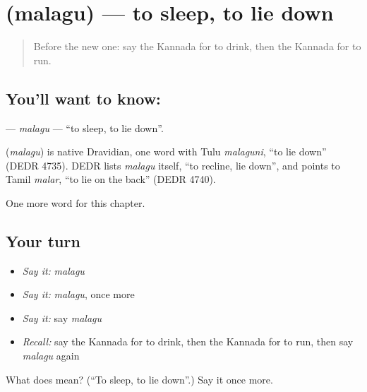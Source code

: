 \section[\texorpdfstring{\kn{ಮಲಗು} (malagu)}{ಮಲಗು (malagu)}]{ (malagu) — to sleep, to lie down}

\label{lesson:KA-C147-malagu}



\begin{quote}
Before the new one: say the Kannada for to drink, then the Kannada for to run.
\end{quote}

\subsection*{You'll want to know: }
\textbf{} — \emph{malagu} — \textquotedblleft{}to sleep, to lie down\textquotedblright{}.

\begin{cousinweb}
\textbf{} (\emph{malagu}) is native Dravidian, one word with Tulu \emph{malaguni}, \textquotedblleft{}to lie down\textquotedblright{} (DEDR 4735). DEDR lists \emph{malagu} itself, \textquotedblleft{}to recline, lie down\textquotedblright{}, and points to Tamil \emph{malar}, \textquotedblleft{}to lie on the back\textquotedblright{} (DEDR 4740).
\end{cousinweb}

\begin{grammarlens}[title={What you've built}]
One more word for this chapter.
\end{grammarlens}

\subsection*{Your turn}
\begin{itemize}
\raggedright
  \item \emph{Say it:} \emph{malagu}
  \item \emph{Say it:} \emph{malagu}, once more
  \item \emph{Say it:} say \emph{malagu}
  \item \emph{Recall:} say the Kannada for to drink, then the Kannada for to run, then say \emph{malagu} again
\end{itemize}

\begin{tcolorbox}[breakable,colback=teal!4,colframe=teal!35!black,title={Before you move on}]
What does  mean? (\textquotedblleft{}To sleep, to lie down\textquotedblright{}.) Say it once more.
\end{tcolorbox}
